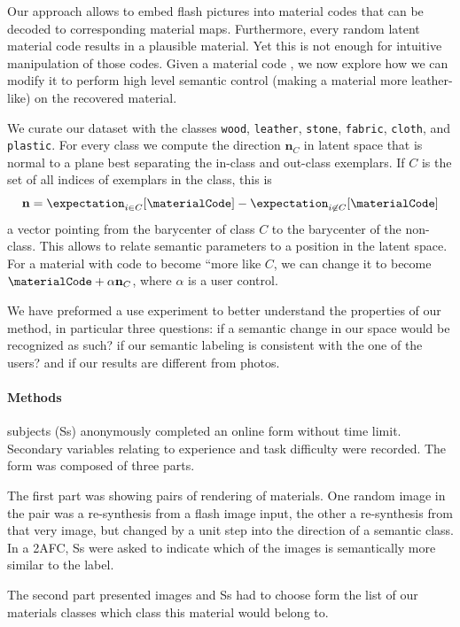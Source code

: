 \documentclass[acmtog, review, anonymous]{acmart}
\begin{document}
Our approach allows to embed flash pictures into material codes that can be decoded to corresponding material maps. Furthermore, every random latent material code results in a plausible material.
Yet this is not enough for intuitive manipulation of those codes.
Given a material code \materialCode, we now explore how we can modify it to perform high level semantic control (\eg making a material more leather-like) on the recovered material.

We curate our dataset with the classes \texttt{wood},
\texttt{leather},
\texttt{stone},
\texttt{fabric},
\texttt{cloth},
and
\texttt{plastic}.
For every class we compute the direction $\mathbf n_C$ in latent space that is normal to a plane best separating the in-class and out-class exemplars.
If $C$ is the set of all indices of exemplars in the class, this is \[
\mathbf n=
\expectation_{i\in C}[\materialCode]-
\expectation_{i\not\in C}[\materialCode]
\]
a vector pointing from the barycenter of class $C$ to the barycenter of the non-class.
This allows to relate semantic parameters to a position in the latent space.
For a material with code \materialCode to become ``more like $C$, we can change it to become $\materialCode+\alpha\mathbf n_C$, where $\alpha$ is a user control. 

We have preformed a use experiment to better understand the properties of our method, in particular three questions: if a semantic change in our space would be recognized as such? if our semantic labeling is consistent with the one of the users? and if our results are different from photos.

\paragraph{Methods}
 subjects (Ss) anonymously completed an online form without time limit.
Secondary variables relating to experience and task difficulty were recorded.
The form was composed of three parts.

The first part was showing  pairs of rendering of materials.
One random image in the pair was a re-synthesis from a flash image input, the other a re-synthesis from that very image, but changed by a unit step into the direction of a semantic class.
In a \ac{2AFC}, Ss were asked to indicate which of the images is semantically more similar to the label.

The second part presented  images and Ss had to choose form the list of our materials classes which class this material would belong to.
\end{document}
